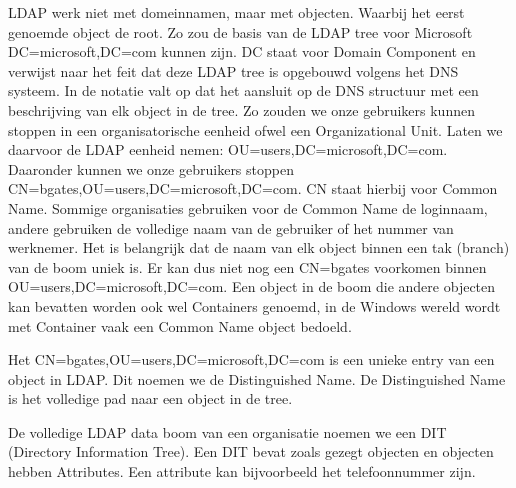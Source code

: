 LDAP werk niet met domeinnamen, maar met objecten. Waarbij het eerst genoemde object de root. Zo zou de basis van de LDAP tree voor Microsoft DC=microsoft,\allowbreak DC=com kunnen zijn. DC staat voor Domain Component en verwijst naar het feit dat deze LDAP tree is opgebouwd volgens het DNS systeem. In de notatie valt op dat het aansluit op de DNS structuur met een beschrijving van elk object in de tree. Zo zouden we onze gebruikers kunnen stoppen in een organisatorische eenheid ofwel een Organizational Unit. Laten we daarvoor de LDAP eenheid nemen: OU=users,\allowbreak DC=microsoft,\allowbreak DC=com. Daaronder kunnen we onze gebruikers stoppen CN=bgates,\allowbreak OU=users,\allowbreak DC=microsoft,\allowbreak DC=com. CN staat hierbij voor Common Name. Sommige organisaties gebruiken voor de Common Name de loginnaam, andere gebruiken de volledige naam van de gebruiker of het nummer van werknemer. Het is belangrijk dat de naam van elk object binnen een tak (branch) van de boom uniek is. Er kan dus niet nog een CN=bgates voorkomen binnen OU=users,\allowbreak DC=microsoft,\allowbreak DC=com. Een object in de boom die andere objecten kan bevatten worden ook wel Containers genoemd, in de Windows wereld wordt met Container vaak een Common Name object bedoeld.

Het  CN=bgates,\allowbreak OU=users,\allowbreak DC=microsoft,\allowbreak DC=com is een unieke entry van een object in LDAP. Dit noemen we de Distinguished Name. De Distinguished Name is het volledige pad naar een object in de tree.

De volledige LDAP data boom van een organisatie noemen we een DIT (Directory Information Tree). Een DIT bevat zoals gezegt objecten en objecten hebben Attributes. Een attribute kan bijvoorbeeld het telefoonnummer zijn.

